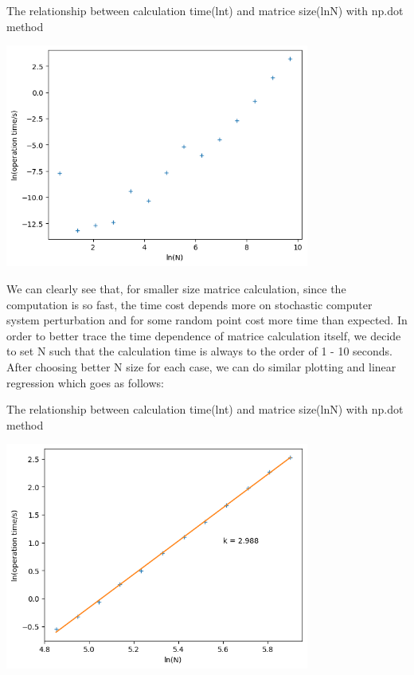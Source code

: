\documentclass[letterpaper,12pt]{article}
\begin{document}
\begin{table}[!h]
    \centering
    \caption{The relationship between calculation time(lnt) and matrice size(lnN) with np.dot method}
    \includegraphics[width=10cm]{ps3-12.png}
    \label{plot}%
\end{table}%
\newpage

We can clearly see that, for smaller size matrice calculation, since the computation is so fast, the time cost depends more on stochastic computer system perturbation and for some random point cost more time than expected. In order to better trace the time dependence of matrice calculation itself, we decide to set N such that the calculation time is always to the order of 1 - 10 seconds. After choosing better N size for each case, we can do similar plotting and linear regression which goes as follows:

\begin{table}[!h]
    \centering
    \caption{The relationship between calculation time(lnt) and matrice size(lnN) with np.dot method}
    \includegraphics[width=10cm]{ps3-13.png}
    \label{plot}%
\end{table}%
\end{document}
